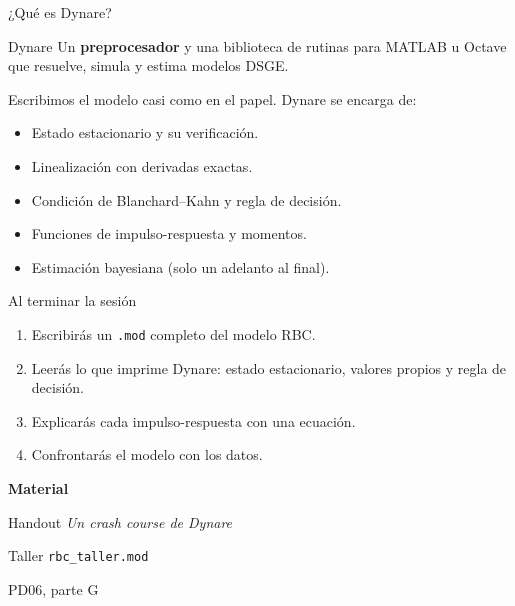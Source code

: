 \begin{frame}[label=que-es-dynare]{¿Qué es Dynare?}
  \begin{bluebox}{Dynare}
    Un \textbf{preprocesador} y una biblioteca de rutinas para MATLAB u Octave que
    resuelve, simula y estima modelos DSGE.
  \end{bluebox}
  \vspace{0.2cm}
  Escribimos el modelo casi como en el papel. Dynare se encarga de:
  \begin{itemize}
    \item Estado estacionario y su verificación.
    \item Linealización con derivadas exactas.
    \item Condición de Blanchard--Kahn y regla de decisión.
    \item Funciones de impulso-respuesta y momentos.
    \item Estimación bayesiana (solo un adelanto al final).
  \end{itemize}
\end{frame}

\begin{frame}[label=objetivos]{Al terminar la sesión}
  \begin{enumerate}
    \item Escribirás un \texttt{.mod} completo del modelo RBC.\par\vspace{0.15cm}
    \item Leerás lo que imprime Dynare: estado estacionario, valores propios y regla de
      decisión.\par\vspace{0.15cm}
    \item Explicarás cada impulso-respuesta con una ecuación.\par\vspace{0.15cm}
    \item Confrontarás el modelo con los datos.
  \end{enumerate}
  \vspace{0.4cm}
  \textbf{Material}\par
  \vspace{0.1cm}
  Handout \emph{Un crash course de Dynare}\par
  Taller \texttt{rbc\_taller.mod}\par
  PD06, parte G
\end{frame}
